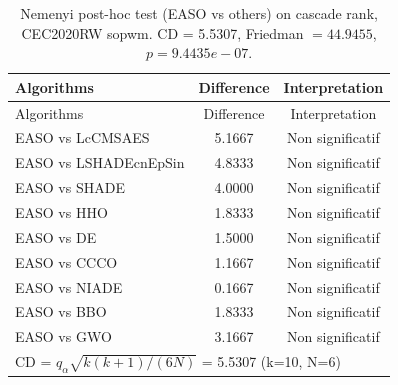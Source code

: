 \begin{center}
\small
\renewcommand{\arraystretch}{1.25}
\begin{longtable}{lcc}
\caption{Nemenyi post-hoc test (EASO vs others) on cascade rank, CEC2020RW  sopwm. CD = 5.5307, Friedman $=44.9455$, $p=9.4435e-07$.}
\label{tab:nemenyi_cascade_CEC2020RW_sopwm} \\
\toprule
Algorithms & Difference & Interpretation \\
\midrule
\endfirsthead
\toprule
Algorithms & Difference & Interpretation \\
\midrule
\endhead
EASO vs LcCMSAES & 5.1667 & Non significatif \\
EASO vs LSHADEcnEpSin & 4.8333 & Non significatif \\
EASO vs SHADE & 4.0000 & Non significatif \\
EASO vs HHO & 1.8333 & Non significatif \\
EASO vs DE & 1.5000 & Non significatif \\
EASO vs CCCO & 1.1667 & Non significatif \\
EASO vs NIADE & 0.1667 & Non significatif \\
EASO vs BBO & 1.8333 & Non significatif \\
EASO vs GWO & 3.1667 & Non significatif \\
\midrule
\multicolumn{3}{l}{CD = $q_\alpha \sqrt{k(k+1)/(6N)}$ = 5.5307 (k=10, N=6)} \\
\bottomrule
\end{longtable}
\end{center}